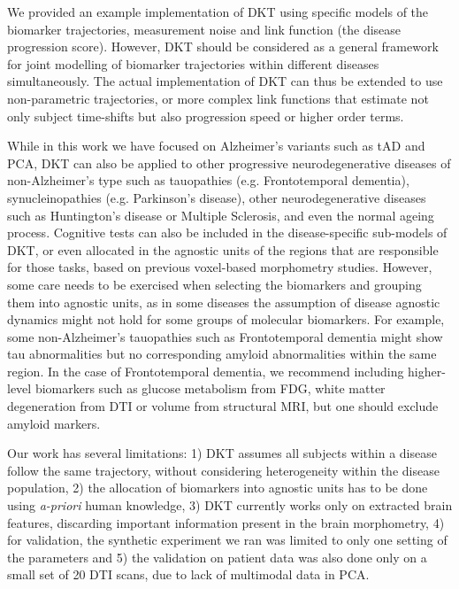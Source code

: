 \documentclass{llncs}
\begin{document}
We provided an example implementation of DKT using specific models of the biomarker trajectories, measurement noise and link function (the disease progression score). However, DKT should be considered as a general framework for joint modelling of biomarker trajectories within different diseases simultaneously. The actual implementation of DKT can thus be extended to use non-parametric trajectories, or more complex link functions that estimate not only subject time-shifts but also progression speed or higher order terms.

While in this work we have focused on Alzheimer's variants such as tAD and PCA, DKT can also be applied to other progressive neurodegenerative diseases of non-Alzheimer's type such as tauopathies (e.g. Frontotemporal dementia), synucleinopathies (e.g. Parkinson's disease), other neurodegenerative diseases such as Huntington's disease or Multiple Sclerosis, and even the normal ageing process. Cognitive tests can also be included in the disease-specific sub-models of DKT, or even allocated in the agnostic units of the regions that are responsible for those tasks, based on previous voxel-based morphometry studies. However, some care needs to be exercised when selecting the biomarkers and grouping them into agnostic units, as in some diseases the assumption of disease agnostic dynamics might not hold for some groups of molecular biomarkers. For example, some non-Alzheimer's tauopathies such as Frontotemporal dementia might show tau abnormalities but no corresponding amyloid abnormalities within the same region. In the case of Frontotemporal dementia, we recommend including higher-level biomarkers such as glucose metabolism from FDG, white matter degeneration from DTI or volume from structural MRI, but one should exclude amyloid markers. 

Our work has several limitations: 1) DKT assumes all subjects within a disease follow the same trajectory, without considering heterogeneity within the disease population, 2) the allocation of biomarkers into agnostic units has to be done using \emph{a-priori} human knowledge, 3) DKT currently works only on extracted brain features, discarding important information present in the brain morphometry, 4) for validation, the synthetic experiment we ran was limited to only one setting of the parameters and 5) the validation on patient data was also done only on a small set of 20 DTI scans, due to lack of multimodal data in PCA.
\end{document}
